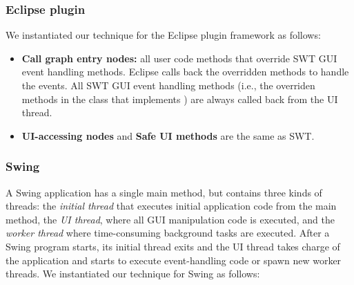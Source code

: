 \tinystep
\tinystep
\subsubsection{Eclipse plugin}

We instantiated our technique for the Eclipse plugin framework as follows:

\smallstep
\begin{myindentpar}{-2mm}

\begin{itemize}

\item \textbf{Call graph entry nodes:}  all user code methods that override
 SWT GUI event handling methods. Eclipse
calls back the overridden methods to handle the
events. All SWT GUI event handling methods (i.e., the overriden
methods in the class that implements ) are
always called back from the UI thread.

\tinystep

\item \textbf{UI-accessing nodes} and \textbf{Safe UI methods} are the same as SWT.

\end{itemize}
\end{myindentpar}

\tinystep
\tinystep
\tinystep
\subsubsection{Swing}

A Swing application has a single main method, but contains three kinds of
threads: the \textit{initial thread} that executes initial application code from the main method,
the \textit{UI thread}, where all GUI manipulation code is executed,
and the \textit{worker thread} where time-consuming background tasks are executed.
After a Swing program starts, its initial thread exits and the UI thread takes charge
of the application and starts to execute event-handling code or spawn new worker threads. 
We instantiated our technique for Swing as follows:

